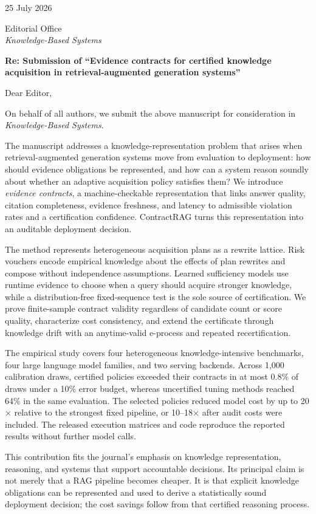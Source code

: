 \documentclass[11pt]{article}
\begin{document}
\raggedright
{}

25 July 2026

Editorial Office\\
\textit{Knowledge-Based Systems}

\textbf{Re: Submission of ``Evidence contracts for certified knowledge
acquisition in retrieval-augmented generation systems''}

Dear Editor,

On behalf of all authors, we submit the above manuscript for consideration in
\textit{Knowledge-Based Systems}.

The manuscript addresses a knowledge-representation problem that arises when
retrieval-augmented generation systems move from evaluation to deployment:
how should evidence obligations be represented, and how can a system reason
soundly about whether an adaptive acquisition policy satisfies them? We
introduce \emph{evidence contracts}, a machine-checkable representation that
links answer quality, citation completeness, evidence freshness, and latency
to admissible violation rates and a certification confidence. ContractRAG
turns this representation into an auditable deployment decision.

The method represents heterogeneous acquisition plans as a rewrite lattice.
Risk vouchers encode empirical knowledge about the effects of plan rewrites
and compose without independence assumptions. Learned sufficiency models use
runtime evidence to choose when a query should acquire stronger knowledge,
while a distribution-free fixed-sequence test is the sole source of
certification. We prove finite-sample contract validity regardless of
candidate count or score quality, characterize cost consistency, and extend
the certificate through knowledge drift with an anytime-valid e-process and
repeated recertification.

The empirical study covers four heterogeneous knowledge-intensive benchmarks,
four large language model families, and two serving backends. Across 1,000
calibration draws, certified policies exceeded their contracts in at most
0.8\% of draws under a 10\% error budget, whereas uncertified tuning methods
reached 64\% in the same evaluation. The selected policies reduced model cost
by up to 20$\times$ relative to the strongest fixed pipeline, or
10--18$\times$ after audit costs were included. The released execution
matrices and code reproduce the reported results without further model calls.

This contribution fits the journal's emphasis on knowledge representation,
reasoning, and systems that support accountable decisions. Its principal
claim is not merely that a RAG pipeline becomes cheaper. It is that explicit
knowledge obligations can be represented and used to derive a statistically
sound deployment decision; the cost savings follow from that certified
reasoning process.
\end{document}
